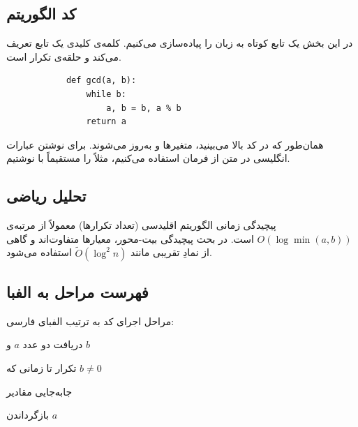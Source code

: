 
\subsection{کد الگوریتم}
در این بخش یک تابع کوتاه به زبان  را پیاده‌سازی می‌کنیم.
کلمه‌ی کلیدی  یک تابع تعریف می‌کند و  حلقه‌ی تکرار است.
\begin{listing}[H]
    \begin{latin}
        \begin{verbatim}
            def gcd(a, b):
                while b:
                    a, b = b, a % b
                return a
        \end{verbatim}
    \end{latin}
\end{listing}

همان‌طور که در کد بالا می‌بینید، متغیرها  و  به‌روز می‌شوند.
برای نوشتن عبارات انگلیسی در متن از فرمان  استفاده می‌کنیم، مثلاً  را مستقیماً با  نوشتیم.

\subsection{تحلیل ریاضی}
پیچیدگی زمانی الگوریتم اقلیدسی (تعداد تکرارها) معمولاً از مرتبه‌ی $O(\log \min(a,b))$ است. در بحث پیچیدگی بیت-محور، معیارها متفاوت‌اند و گاهی از نمادِ تقریبی مانند $\tilde{O}(\log^2 n)$ استفاده می‌شود.

\subsection{فهرست مراحل به الفبا}
مراحل اجرای کد به ترتیب الفبای فارسی:
\begin{الفبا}
\item دریافت دو عدد $a$ و $b$
\item تکرار تا زمانی که $b \neq 0$
\item جابه‌جایی مقادیر
\item بازگرداندن $a$
\end{الفبا}